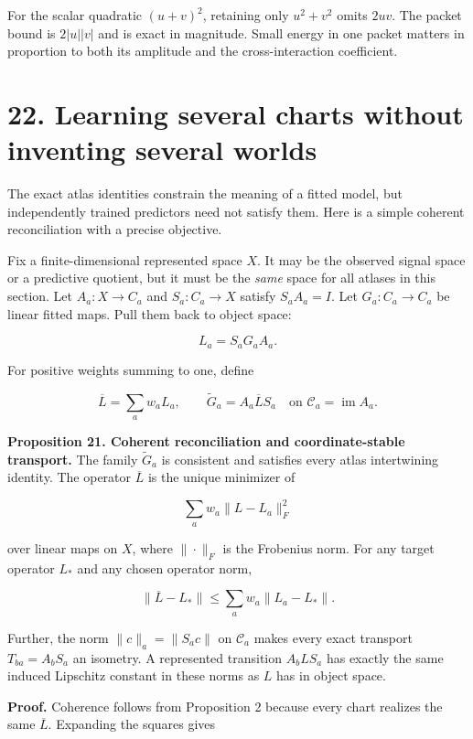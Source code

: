 \documentclass[11pt,letterpaper]{article}
\begin{document}
For the scalar quadratic \((u+v)^2\), retaining only \(u^2+v^2\) omits
\(2uv\). The packet bound is \(2|u||v|\) and is exact in magnitude.
Small energy in one packet matters in proportion to both its amplitude
and the cross-interaction coefficient.

\section{22. Learning several charts without inventing several
worlds}\label{learning-several-charts-without-inventing-several-worlds}

The exact atlas identities constrain the meaning of a fitted model, but
independently trained predictors need not satisfy them. Here is a simple
coherent reconciliation with a precise objective.

Fix a finite-dimensional represented space \(X\). It may be the observed
signal space or a predictive quotient, but it must be the \emph{same}
space for all atlases in this section. Let \(A_a:X\to C_a\) and
\(S_a:C_a\to X\) satisfy \(S_aA_a=I\). Let \(G_a:C_a\to C_a\) be linear
fitted maps. Pull them back to object space:

\[
L_a=S_aG_aA_a.
\]

For positive weights summing to one, define

\[
\overline L=\sum_aw_aL_a,
\qquad\widetilde G_a=A_a\overline LS_a
\quad\text{on }\mathcal C_a=\operatorname{im}A_a.
\]

\textbf{Proposition 21. Coherent reconciliation and coordinate-stable
transport.} The family \(\widetilde G_a\) is consistent and satisfies
every atlas intertwining identity. The operator \(\overline L\) is the
unique minimizer of

\[
\sum_aw_a\|L-L_a\|_F^2
\]

over linear maps on \(X\), where \(\|\cdot\|_F\) is the Frobenius norm.
For any target operator \(L_*\) and any chosen operator norm,

\[
\|\overline L-L_*\|\leq\sum_aw_a\|L_a-L_*\|.
\]

Further, the norm \(\|c\|_a=\|S_ac\|\) on \(\mathcal C_a\) makes every
exact transport \(T_{ba}=A_bS_a\) an isometry. A represented transition
\(A_bLS_a\) has exactly the same induced Lipschitz constant in these
norms as \(L\) has in object space.

\textbf{Proof.} Coherence follows from Proposition 2 because every chart
realizes the same \(\overline L\). Expanding the squares gives
\end{document}
